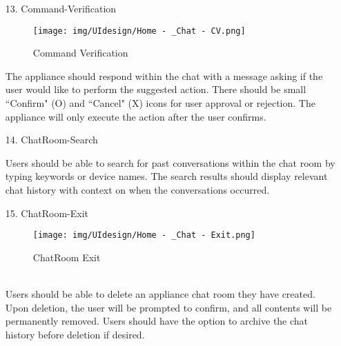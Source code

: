 \documentclass[conference]{IEEEtran}
\begin{document}
\begin{enumerate}
    \item[13.] Command-Verification
    \begin{figure}[h]
\hspace{1.5cm}
\centering
\begin{minipage}{0.4\columnwidth}
    \texttt{[image: img/UIdesign/Home - \_Chat - CV.png]}
    \caption{Command Verification}
\end{minipage}
\end{figure}
    
    The appliance should respond within the chat with a message asking if the user would like to perform the suggested action. There should be small ``Confirm" (O) and ``Cancel" (X) icons for user approval or rejection. The appliance will only execute the action after the user confirms. \\ 
\end{enumerate}

\begin{enumerate}
    \item[14.] ChatRoom-Search
    
    Users should be able to search for past conversations within the chat room by typing keywords or device names. The search results should display relevant chat history with context on when the conversations occurred. \\ 
\end{enumerate}

\begin{enumerate}
    \item[15.] ChatRoom-Exit
    \begin{figure}[h]
\hspace{1.5cm}
\centering
\begin{minipage}{0.4\columnwidth}
    \texttt{[image: img/UIdesign/Home - \_Chat - Exit.png]}
    \caption{ChatRoom Exit}
\end{minipage}
\end{figure}
\\ Users should be able to delete an appliance chat room they have created. Upon deletion, the user will be prompted to confirm, and all contents will be permanently removed. Users should have the option to archive the chat history before deletion if desired.
\end{enumerate}

\clearpage
\end{document}

